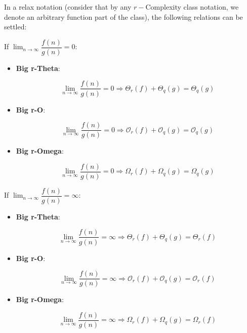 In a relax notation (consider that by any  $r-$Complexity class notation, we denote an arbitrary function part of the class), the following relations can be settled:


If $\lim_{n\to\infty} \dfrac{f(n)}{g(n)} = 0$:
\begin{itemize}
    \item \textbf{Big r-Theta}:
    \begin{lemma}
        \[  \lim_{n\to\infty} \dfrac{f(n)}{g(n)} = 0 \Rightarrow \Theta_{r}(f) + \Theta_{q}(g) = \Theta_{q}(g)\]
    \end{lemma}
    \item \textbf{Big r-O}:
    \begin{lemma}
        \[  \lim_{n\to\infty} \dfrac{f(n)}{g(n)} = 0 \Rightarrow \mathcal{O}_{r}(f) + \mathcal{O}_{q}(g) = \mathcal{O}_{q}(g)\]
    \end{lemma}
    \item \textbf{Big r-Omega}:
    \begin{lemma}
        \[  \lim_{n\to\infty} \dfrac{f(n)}{g(n)} = 0 \Rightarrow \Omega_{r}(f) + \Omega_{q}(g) = \Omega_{q}(g)\]
    \end{lemma}
\end{itemize}


If $\lim_{n\to\infty} \dfrac{f(n)}{g(n)} = \infty$:
\begin{itemize}
    \item \textbf{Big r-Theta}:
    \begin{lemma}
        \[  \lim_{n\to\infty} \dfrac{f(n)}{g(n)} = \infty \Rightarrow \Theta_{r}(f) + \Theta_{q}(g) = \Theta_{r}(f)\]
    \end{lemma}
    \item \textbf{Big r-O}:
    \begin{lemma}
        \[ \lim_{n\to\infty} \dfrac{f(n)}{g(n)} = \infty \Rightarrow \mathcal{O}_{r}(f) + \mathcal{O}_{q}(g) = \mathcal{O}_{r}(f)\]
    \end{lemma}
    \item \textbf{Big r-Omega}:
    \begin{lemma}
        \[ \lim_{n\to\infty} \dfrac{f(n)}{g(n)} = \infty \Rightarrow \Omega_{r}(f) + \Omega_{q}(g) = \Omega_{r}(f)\]
    \end{lemma}
\end{itemize}

